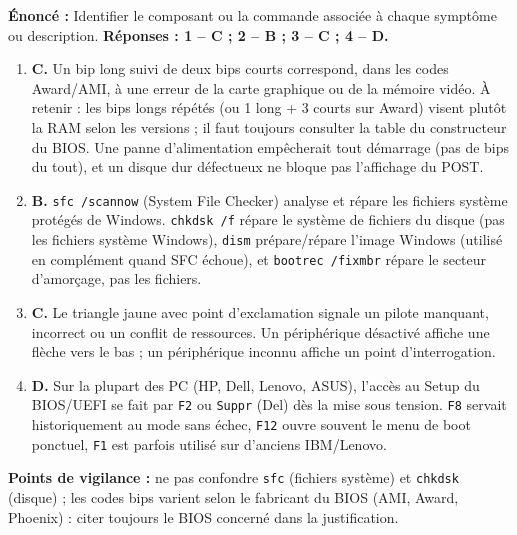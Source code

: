 \documentclass[11pt]{article}
\newcommand{\cle}[1]{{\popxbold\color{popdark}#1}}
\begin{document}
\begin{corrige}
\textbf{Énoncé :} Identifier le composant ou la commande associée à chaque symptôme ou description.
\tcblower
\textbf{Réponses : 1 -- C ; 2 -- B ; 3 -- C ; 4 -- D.}

\begin{enumerate}
    \item \textbf{C.} Un bip long suivi de deux bips courts correspond, dans les codes Award/AMI, à une erreur de la \cle{carte graphique} ou de la mémoire vidéo. À retenir : les bips longs répétés (ou 1 long + 3 courts sur Award) visent plutôt la RAM selon les versions ; il faut toujours consulter la table du constructeur du BIOS. Une panne d'alimentation empêcherait tout démarrage (pas de bips du tout), et un disque dur défectueux ne bloque pas l'affichage du POST.
    \item \textbf{B.} \texttt{sfc /scannow} (System File Checker) analyse et répare les \cle{fichiers système} protégés de Windows. \texttt{chkdsk /f} répare le système de fichiers du disque (pas les fichiers système Windows), \texttt{dism} prépare/répare l'image Windows (utilisé en complément quand SFC échoue), et \texttt{bootrec /fixmbr} répare le secteur d'amorçage, pas les fichiers.
    \item \textbf{C.} Le triangle jaune avec point d'exclamation signale un \cle{pilote} manquant, incorrect ou un conflit de ressources. Un périphérique désactivé affiche une flèche vers le bas ; un périphérique inconnu affiche un point d'interrogation.
    \item \textbf{D.} Sur la plupart des PC (HP, Dell, Lenovo, ASUS), l'accès au Setup du BIOS/UEFI se fait par \texttt{F2} ou \texttt{Suppr} (Del) dès la mise sous tension. \texttt{F8} servait historiquement au mode sans échec, \texttt{F12} ouvre souvent le menu de boot ponctuel, \texttt{F1} est parfois utilisé sur d'anciens IBM/Lenovo.
\end{enumerate}

\textbf{Points de vigilance :} ne pas confondre \texttt{sfc} (fichiers système) et \texttt{chkdsk} (disque) ; les codes bips varient selon le fabricant du BIOS (AMI, Award, Phoenix) : citer toujours le BIOS concerné dans la justification.
\end{corrige}
\end{document}
